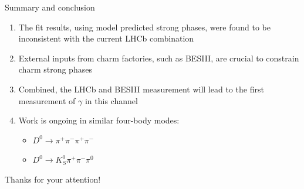 \documentclass{beamer}
\begin{document}
\begin{frame}{Summary and conclusion}
  \begin{enumerate}
    \setlength\itemsep{1.0em}
    \setcounter{enumi}{4}
    \item{The fit results, using model predicted strong phases, were found to be inconsistent with the current LHCb combination}
    \item{External inputs from charm factories, such as BESIII, are crucial to constrain charm strong phases}
    \item{Combined, the LHCb and BESIII measurement will lead to the first measurement of $\gamma$ in this channel}
    \item{Work is ongoing in similar four-body modes:}
    \begin{itemize}
      \item{$D^0\to\pi^+\pi^-\pi^+\pi^-$}
      \item{$D^0\to K_S^0\pi^+\pi^-\pi^0$}
    \end{itemize}
  \end{enumerate}
  \vspace{0.2cm}
  \begin{center}
    {\huge Thanks for your attention!}
  \end{center}
\end{frame}
\end{document}
